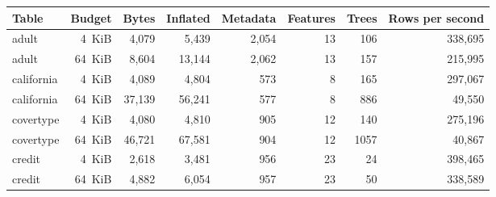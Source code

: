 \begin{tabular}{lrrrrrrr}
\toprule
Table & Budget & Bytes & Inflated & Metadata & Features & Trees & Rows per second \\
\midrule
adult & 4~KiB & 4{,}079 & 5{,}439 & 2{,}054 & 13 & 106 & 338{,}695 \\
adult & 64~KiB & 8{,}604 & 13{,}144 & 2{,}062 & 13 & 157 & 215{,}995 \\
california & 4~KiB & 4{,}089 & 4{,}804 & 573 & 8 & 165 & 297{,}067 \\
california & 64~KiB & 37{,}139 & 56{,}241 & 577 & 8 & 886 & 49{,}550 \\
covertype & 4~KiB & 4{,}080 & 4{,}810 & 905 & 12 & 140 & 275{,}196 \\
covertype & 64~KiB & 46{,}721 & 67{,}581 & 904 & 12 & 1057 & 40{,}867 \\
credit & 4~KiB & 2{,}618 & 3{,}481 & 956 & 23 & 24 & 398{,}465 \\
credit & 64~KiB & 4{,}882 & 6{,}054 & 957 & 23 & 50 & 338{,}589 \\
\bottomrule
\end{tabular}

